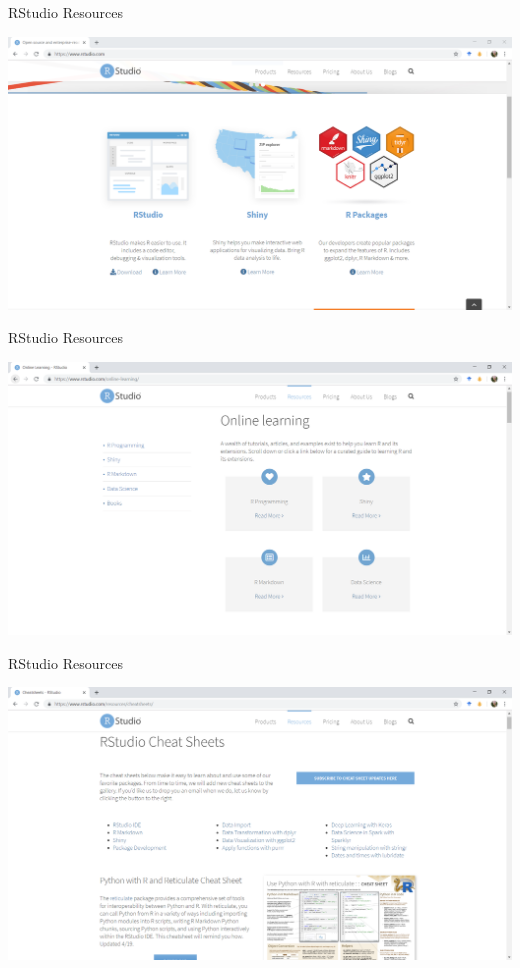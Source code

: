 \documentclass[ignorenonframetext,]{beamer}
\begin{document}
\begin{frame}{RStudio Resources}
\protect\hypertarget{rstudio-resources}{}

\includegraphics{../external/images/rstudio_dot_com_1_main.PNG}

\end{frame}

\begin{frame}{RStudio Resources}
\protect\hypertarget{rstudio-resources-1}{}

\includegraphics{../external/images/rstudio_dot_com_2_learning.PNG}

\end{frame}

\begin{frame}{RStudio Resources}
\protect\hypertarget{rstudio-resources-2}{}

\includegraphics{../external/images/rstudio_dot_com_3_cheats.PNG}

\end{frame}
\end{document}
